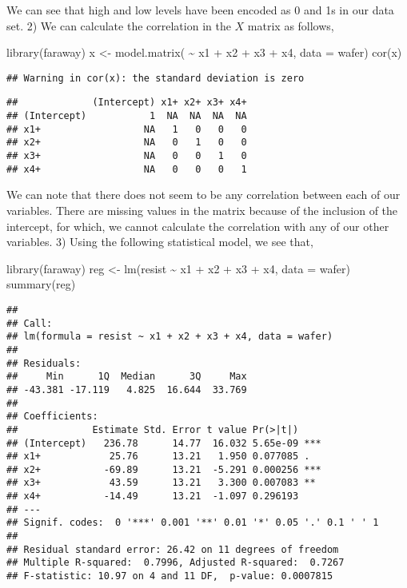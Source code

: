\documentclass[
]{article}
\newenvironment{Shaded}{\begin{snugshade}}{\end{snugshade}}
\newcommand{\AttributeTok}[1]{\textcolor[rgb]{0.77,0.63,0.00}{#1}}
\newcommand{\FunctionTok}[1]{\textcolor[rgb]{0.00,0.00,0.00}{#1}}
\newcommand{\NormalTok}[1]{#1}
\newcommand{\OtherTok}[1]{\textcolor[rgb]{0.56,0.35,0.01}{#1}}
\newcommand{\SpecialCharTok}[1]{\textcolor[rgb]{0.00,0.00,0.00}{#1}}
\begin{document}
We can see that high and low levels have been encoded as 0 and 1s in our
data set. 2) We can calculate the correlation in the \(X\) matrix as
follows,

\begin{Shaded}
\begin{Highlighting}[]
  \FunctionTok{library}\NormalTok{(faraway)}
\NormalTok{  x }\OtherTok{\textless{}{-}} \FunctionTok{model.matrix}\NormalTok{( }\SpecialCharTok{\textasciitilde{}}\NormalTok{ x1 }\SpecialCharTok{+}\NormalTok{ x2 }\SpecialCharTok{+}\NormalTok{ x3 }\SpecialCharTok{+}\NormalTok{ x4, }\AttributeTok{data =}\NormalTok{ wafer)}
  \FunctionTok{cor}\NormalTok{(x)}
\end{Highlighting}
\end{Shaded}

\begin{verbatim}
## Warning in cor(x): the standard deviation is zero
\end{verbatim}

\begin{verbatim}
##             (Intercept) x1+ x2+ x3+ x4+
## (Intercept)           1  NA  NA  NA  NA
## x1+                  NA   1   0   0   0
## x2+                  NA   0   1   0   0
## x3+                  NA   0   0   1   0
## x4+                  NA   0   0   0   1
\end{verbatim}

We can note that there does not seem to be any correlation between each
of our variables. There are missing values in the matrix because of the
inclusion of the intercept, for which, we cannot calculate the
correlation with any of our other variables. 3) Using the following
statistical model, we see that,

\begin{Shaded}
\begin{Highlighting}[]
  \FunctionTok{library}\NormalTok{(faraway)}
\NormalTok{  reg }\OtherTok{\textless{}{-}} \FunctionTok{lm}\NormalTok{(resist }\SpecialCharTok{\textasciitilde{}}\NormalTok{ x1 }\SpecialCharTok{+}\NormalTok{ x2 }\SpecialCharTok{+}\NormalTok{ x3 }\SpecialCharTok{+}\NormalTok{ x4, }\AttributeTok{data =}\NormalTok{ wafer)}
  \FunctionTok{summary}\NormalTok{(reg)}
\end{Highlighting}
\end{Shaded}

\begin{verbatim}
## 
## Call:
## lm(formula = resist ~ x1 + x2 + x3 + x4, data = wafer)
## 
## Residuals:
##     Min      1Q  Median      3Q     Max 
## -43.381 -17.119   4.825  16.644  33.769 
## 
## Coefficients:
##             Estimate Std. Error t value Pr(>|t|)    
## (Intercept)   236.78      14.77  16.032 5.65e-09 ***
## x1+            25.76      13.21   1.950 0.077085 .  
## x2+           -69.89      13.21  -5.291 0.000256 ***
## x3+            43.59      13.21   3.300 0.007083 ** 
## x4+           -14.49      13.21  -1.097 0.296193    
## ---
## Signif. codes:  0 '***' 0.001 '**' 0.01 '*' 0.05 '.' 0.1 ' ' 1
## 
## Residual standard error: 26.42 on 11 degrees of freedom
## Multiple R-squared:  0.7996, Adjusted R-squared:  0.7267 
## F-statistic: 10.97 on 4 and 11 DF,  p-value: 0.0007815
\end{verbatim}
\end{document}
